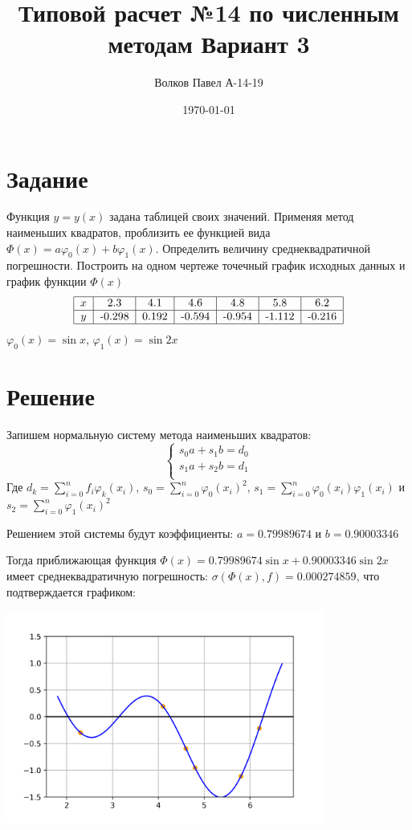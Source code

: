 \documentclass[a4paper,12pt]{report} %
\author{Волков Павел А-14-19}
\title{Типовой расчет №14 по численным методам Вариант 3}
\date{\today}
\begin{document}

\maketitle

\newpage
\section*{Задание}

Функция $y = y(x)$ задана таблицей своих значений. Применяя метод наименьших квадратов, проблизить ее функцией вида $\Phi(x) = a\varphi_0(x) + b\varphi_1(x)$. Определить величину среднеквадратичной погрешности. Построить на одном чертеже точечный график исходных данных и график функции $\Phi(x)$
\[
\begin{tabular}{ | c | c | c | c | c | c | c |}
	\hline
	$x$ & 2.3 & 4.1 & 4.6 & 4.8 & 5.8 & 6.2 \\ \hline
	$y$ & -0.298 & 0.192 & -0.594 & -0.954 & -1.112 & -0.216 \\ \hline
\end{tabular}
\]
$\varphi_0(x) = \sin{x}$, $\varphi_1(x) = \sin{2x}$

\section*{Решение}

Запишем нормальную систему метода наименьших квадратов:
\[
	\left\{
		\begin{aligned}
		s_0a + s_1b = d_0  \\
		s_1a + s_2b = d_1 \\
		\end{aligned}
	\right.
\]
Где $d_k = \sum\limits_{i=0}^n f_i\varphi_k(x_i)$, $s_0 = \sum\limits_{i=0}^n \varphi_0(x_i)^2$, $s_1 =  \sum\limits_{i=0}^n \varphi_0(x_i)\varphi_1(x_i)$ и $s_2 =  \sum\limits_{i=0}^n \varphi_1(x_i)^2$

Решением этой системы будут коэффициенты: $a = 0.79989674$ и $b = 0.90003346$

Тогда приближающая функция $\Phi(x) = 0.79989674\sin{x} +  0.90003346\sin{2x}$ имеет среднеквадратичную погрешность: $\sigma(\Phi(x), f) = 0.000274859$, что подтверждается графиком:

\includegraphics[height=7cm]{regular_calc_14.png}
\end{document}
